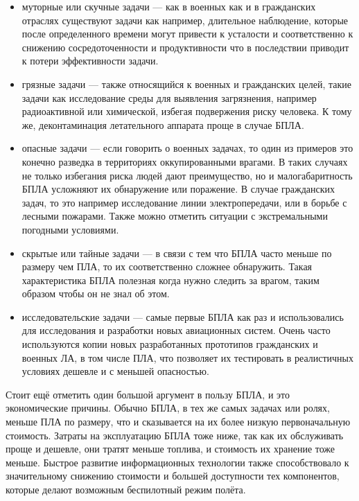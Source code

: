 \documentclass[specification,annotation]{itmo-student-thesis}
\begin{document}
\begin{itemize}
  \item муторные или скучные задачи --- как в военных как и в гражданских
    отраслях существуют задачи как например, длительное наблюдение, которые
    после определенного времени могут привести к усталости и соответственно к
    снижению сосредоточенности и продуктивности что в последствии приводит к
    потери эффективности задачи.
  \item грязные задачи --- также относящийся к военных и гражданских целей, такие
    задачи как исследование среды для выявления загрязнения, например
    радиоактивной или химической, избегая подвержения риску человека. К тому же,
    деконтаминация летательного аппарата проще в случае БПЛА.
  \item опасные задачи --- если говорить о военных задачах, то один из примеров
    это конечно разведка в территориях оккупированными врагами. В таких случаях
    не только избегания риска людей дают преимущество, но и малогабаритность
    БПЛА усложняют их обнаружение или поражение. В случае гражданских задач, то
    это например исследование линии электропередачи, или в борьбе с лесными
    пожарами. Также можно отметить ситуации с экстремальными погодными
    условиями.
  \item скрытые или тайные задачи --- в связи с тем что БПЛА часто меньше по
    размеру чем ПЛА, то их соответственно сложнее обнаружить. Такая
    характеристика БПЛА полезная когда нужно следить за врагом, таким образом
    чтобы он не знал об этом.
  \item исследовательские задачи --- самые первые БПЛА как раз и использовались
    для исследования и разработки новых авиационных систем. Очень часто
    используются копии новых разработанных прототипов гражданских и военных ЛА,
    в том числе ПЛА, что позволяет их тестировать в реалистичных условиях
    дешевле и с меньшей опасностью.
\end{itemize}

Стоит ещё отметить один большой аргумент в пользу БПЛА, и это экономические
причины. Обычно БПЛА, в тех же самых задачах или ролях, меньше ПЛА по размеру,
что и сказывается на их более низкую первоначальную стоимость. Затраты на
эксплуатацию БПЛА тоже ниже, так как их обслуживать проще и дешевле, они тратят
меньше топлива, и стоимость их хранение тоже меньше. Быстрое развитие
информационных технологии также способствовало к значительному снижению
стоимости и большей доступности тех компонентов, которые делают возможным
беспилотный режим полёта.
\end{document}
